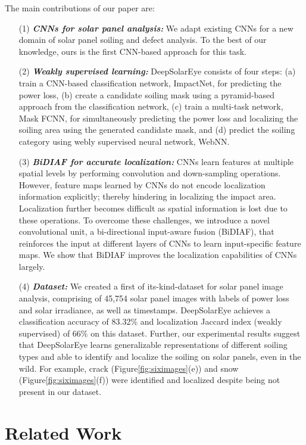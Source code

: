 \documentclass[10pt,twocolumn,letterpaper]{article}
\begin{document}
The main contributions of our paper are: 
\begin{itemize}[itemsep=0pt]
\item[{(1)}] {\it \textbf{CNNs for solar panel analysis:}} We adapt existing CNNs for a new domain of solar panel soiling and defect analysis. To the best of our knowledge, ours is the first CNN-based approach for this task. 
\item[{(2)}] {\it \textbf{Weakly supervised learning:}} DeepSolarEye consists of four steps: (a) train a CNN-based classification network, ImpactNet, for predicting the power loss, (b) create a candidate soiling mask using a  pyramid-based approach from the classification network, (c) train a multi-task network, Mask FCNN, for simultaneously predicting the power loss and localizing the soiling area using the generated candidate mask, and (d) predict the soiling category using webly supervised neural network, WebNN. 
\item[{(3)}] {\it \textbf{ BiDIAF for accurate localization:}} CNNs learn features at multiple spatial levels by performing convolution and down-sampling operations. However, feature maps learned by CNNs do not encode localization information explicitly; thereby hindering in localizing the impact area. Localization further becomes difficult as spatial information is lost due to these operations. To overcome these challenges, we introduce a novel convolutional unit, a bi-directional input-aware fusion (BiDIAF), that reinforces the input at different layers of CNNs to learn input-specific feature maps. We show that BiDIAF  improves the localization capabilities of CNNs largely. 
\item[{(4)}] {\it \textbf{ Dataset:}} We created a first of its-kind-dataset for solar panel image analysis, comprising of 45,754 solar panel images with labels of power loss and solar irradiance, as well as timestamps. DeepSolarEye achieves a classification accuracy of 83.32\% and localization Jaccard index (weakly supervised) of 66\% on this dataset. Further, our experimental results suggest that DeepSolarEye learns generalizable representations of different soiling types and able to identify and localize the soiling on solar panels, even in the wild. For example, crack (Figure\ref{fig:siximages}(e)) and snow (Figure\ref{fig:siximages}(f)) were identified and localized despite being not present in our dataset.
\end{itemize}

\vspace{-2mm}
\section{Related Work}
\vspace{-2mm}
\end{document}
